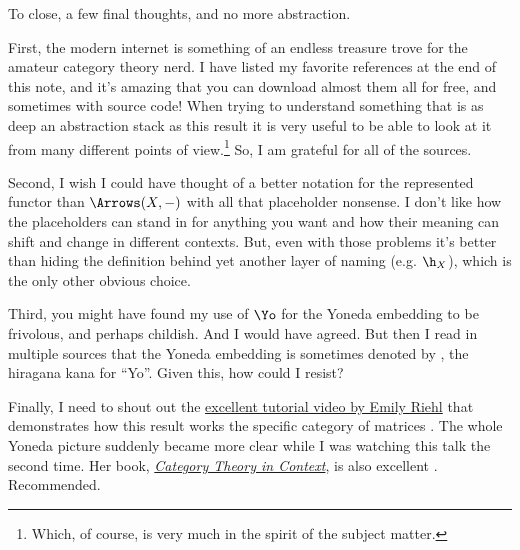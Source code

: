 To close, a few final thoughts, and no more abstraction.

First, the modern internet is something of an endless treasure trove for the amateur category theory nerd.
I have listed my favorite references at the end of this note, and it's amazing that you can download
almost them all for free, and sometimes with source code! When trying to understand something that is as 
deep an abstraction stack as this result it is very useful to be able to look at it from many different
points of view.\footnote{Which, of course, is very much in the spirit of the subject matter.}
So, I am grateful for all of the sources. 

Second, I wish I could have thought of a better notation for the represented functor
than $\Arrows(X,-)$ with all that placeholder nonsense. I don't like how the placeholders
can stand in for anything you want and how their meaning can shift and change in different contexts.
But, even with those problems it's better than hiding the definition behind yet another
layer of naming (e.g. $\h_X$), which is the only other obvious choice. 

Third, you might have found my use of $\Yo$ for the Yoneda embedding to be frivolous, and perhaps
childish. And I would have agreed. But then I read in multiple sources that
the Yoneda embedding is sometimes denoted by \!\!\yo, the hiragana kana for ``Yo''.
Given this, how could I resist?

Finally, I need to shout out the 
\href{https://www.youtube.com/watch?v=SsgEvrDFJsM}{excellent tutorial video by Emily Riehl} 
that demonstrates how this result works
the specific category of matrices \cite{Riehl2020}. The whole Yoneda picture suddenly
became more clear while I was watching this talk the second time.
Her book, \href{https://emilyriehl.github.io/files/context.pdf}{\it Category
Theory in Context}, is also excellent \cite{Riehl2016}. Recommended.

\newpage

